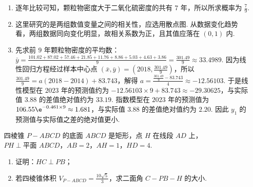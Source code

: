 \begin{solution}
\begin{enumerate}
\item 逐年比较可知，颗粒物密度大于二氧化硫密度的共有 \( 7 \) 年，所以所求概率为 \( \frac{7}{9} \).

\item 这里研究的是两组数值变量之间的相关性，应选用散点图. 从数据变化趋势看，两组数据同向变化明显，故相关系数为正，且其值应落在 \( \left( 0,1 \right) \) 内.

\item 先求前 \( 9 \) 年颗粒物密度的平均数：\( \bar y=\frac{101.02+87.02+57.46+21.85+11.76+8.86+5.03+4.63+3.86}{9}=\frac{301.49}{9}\approx33.4989 \). 因为线性回归方程经过样本中心点 \( \left( \bar x,\bar y \right)=\left( 2018,\frac{301.49}{9} \right) \)，所以 \( \frac{301.49}{9}=a\left( 2018-2014 \right)+83.743 \)，解得 \( a=\frac{\frac{301.49}{9}-83.743}{4}\approx-12.56103 \). 于是线性模型在 \( 2023 \) 年的预测值约为 \( -12.56103\times 9+83.743\approx-29.30625 \)，与实际值 \( 3.88 \) 的差值绝对值约为 \( 33.19 \). 指数模型在 \( 2023 \) 年的预测值为 \( 106.55\e^{-0.461\times 9}\approx1.681 \)，与实际值 \( 3.88 \) 的差值绝对值约为 \( 2.20 \). 因此 \( y_1 \) 的预测值与实际值之差的绝对值更小.
\end{enumerate}
\end{solution}

\begin{problem}
四棱锥 \( P-ABCD \) 的底面 \(ABCD\) 是矩形，点 \(H\) 在线段 \(AD\) 上，\( PH\perp\text{平面 }ABCD \)，\( AB=2 \)，\( AH=1 \)，\( HD=4 \).

\begin{enumerate}
\item 证明：\( HC \perp PB \)；
\item 若四棱锥体积 \( V_{P-ABCD}=\frac{10\sqrt{5}}{3} \)，求二面角 \( C-PB-H \) 的大小.
\end{enumerate}

\end{problem}

